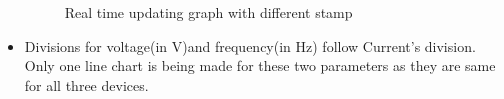 \documentclass[a4paper,12pt,oneside]{book}
\begin{document}
\begin{itemize}
	\begin{figure}%
		\centering
		\qquad
		\caption{Real time updating graph with different stamp }%
		\label{27}%
	\end{figure}
	
	\item{Divisions for voltage(in V)and frequency(in Hz) follow Current's division.	
		\\ Only one line chart is being made for these two parameters as they are same for all three devices.}
	

\end{itemize}
\end{document}
